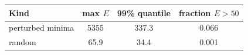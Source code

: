 \begin{tabular}{lccc}
\toprule
Kind & max $E$ & 99\% quantile & fraction $E>50$ \\
\midrule
perturbed minima & 5355 & 337.3 & 0.066 \\
random & 65.9 & 34.4 & 0.001 \\
\bottomrule
\end{tabular}